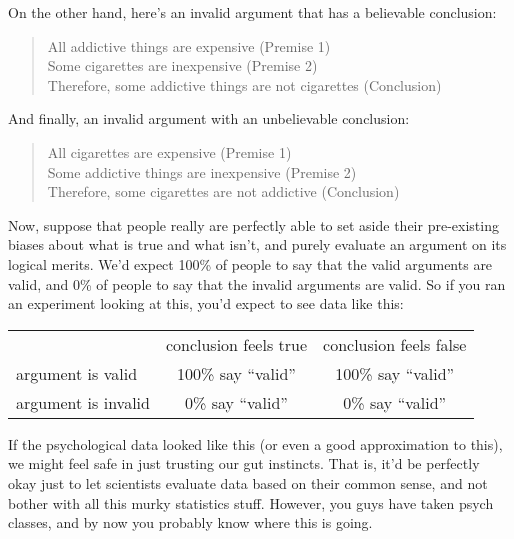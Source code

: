 On the other hand, here's an invalid argument that has a believable conclusion:
\begin{quote}
All addictive things are expensive (Premise 1)\\
Some cigarettes are inexpensive (Premise 2)\\
Therefore, some addictive things are not cigarettes (Conclusion)
\end{quote}
And finally, an invalid argument with an unbelievable conclusion:
\begin{quote}
All cigarettes are expensive (Premise 1)\\
Some addictive things are inexpensive (Premise 2)\\
Therefore, some cigarettes are not addictive (Conclusion)
\end{quote}
Now, suppose that people really are perfectly able to set aside their pre-existing biases about what is true and what isn't, and purely evaluate an argument on its logical merits. We'd expect 100\% of people to say that the valid arguments are valid, and 0\% of people to say that the invalid arguments are valid. So if you ran an experiment looking at this, you'd expect to see data like this:

\begin{center}
\begin{tabular}{lcc}
\hline
~                   & conclusion feels true & conclusion feels false\\
\cline{2-3}
argument is valid   & 100\% say ``valid''   & 100\% say ``valid'' \\ 
argument is invalid &   0\% say ``valid''   &   0\% say ``valid'' \\
\hline
\end{tabular}
\end{center}

\noindent
If the psychological data looked like this (or even a good approximation to this), we might feel safe in just trusting our gut instincts. That is, it'd be perfectly okay just to let scientists evaluate data based on their common sense, and not bother with all this murky statistics stuff. However, you guys have taken psych classes, and by now you probably know where this is going.

